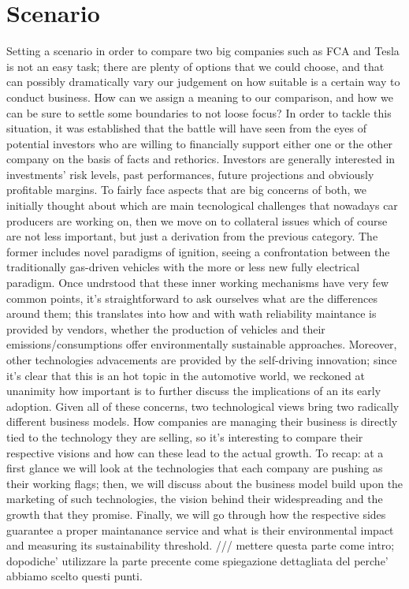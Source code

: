 \section{Scenario}

Setting a scenario in order to compare two big companies such as FCA and Tesla is not an easy task; there are plenty of options that we could choose, and that can possibly dramatically vary our judgement on how suitable is a certain way to conduct business. How can we assign a meaning to our comparison, and how we can be sure to settle some boundaries to not loose focus?
In order to tackle this situation, it was established that the battle will have seen from the eyes of potential investors who are willing to financially support either one or the other company on the basis of facts and rethorics. \n
Investors are generally interested in investments' risk levels, past performances, future projections and obviously profitable margins. To fairly face aspects that are big concerns of both, we initially thought about which are main tecnological challenges that nowadays car producers are working on, then we move on to collateral issues which of course are not less important, but just a derivation from the previous category. The former includes novel paradigms of ignition, seeing a confrontation between the traditionally gas-driven vehicles with the more or less new fully electrical paradigm. Once undrstood that these inner working mechanisms have very few common points, it's straightforward to ask ourselves what are the differences around them; this translates into how and with wath reliability maintance is provided by vendors, whether the production of vehicles and their emissions/consumptions offer environmentally sustainable approaches.
Moreover, other technologies advacements are provided by the self-driving innovation; since it's clear that this is an hot topic in the automotive world, we reckoned at unanimity how important is to further discuss the implications of an its early adoption.
Given all of these concerns, two technological views bring two radically different business models. How companies are managing their business is directly tied to the technology they are selling, so it's interesting to compare their respective visions and how can these lead to the actual growth. \n
To recap: at a first glance we will look at the technologies that each company are pushing as their working flags; then, we will discuss about the business model build upon the marketing of such technologies, the vision behind their widespreading and the growth that they promise. Finally, we will go through how the respective sides guarantee a proper maintanance service and what is their environmental impact and measuring its sustainability threshold. /// mettere questa parte come intro; dopodiche' utilizzare la parte precente come spiegazione dettagliata del perche' abbiamo scelto questi punti.



